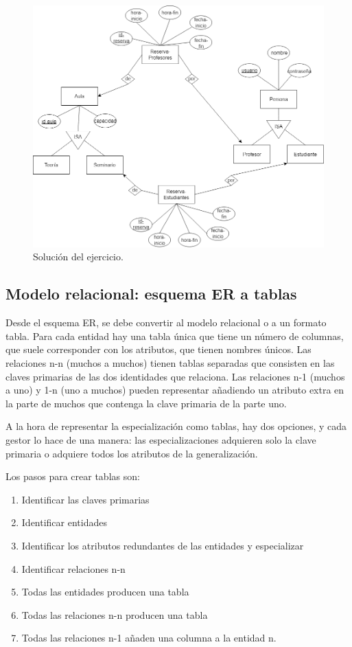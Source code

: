 \begin{figure}[htbp]
\centering
\includegraphics[width=0.7\linewidth]{figs/ejercicio-er-1.drawio.png}
\caption{Solución del ejercicio.}
\end{figure}

\subsection{Modelo relacional: esquema ER a tablas}
Desde el esquema ER, se debe convertir al modelo relacional o a un formato tabla. Para cada entidad hay una tabla única que tiene un número de columnas, que suele corresponder con los atributos, que tienen nombres únicos. Las relaciones n-n (muchos a muchos) tienen tablas separadas que consisten en las claves primarias de las dos identidades que relaciona. Las relaciones n-1 (muchos a uno) y 1-n (uno a muchos) pueden representar añadiendo un atributo extra en la parte de muchos que contenga la clave primaria de la parte uno.

A la hora de representar la especialización como tablas, hay dos opciones, y cada gestor lo hace de una manera: las especializaciones adquieren solo la clave primaria o adquiere todos los atributos de la generalización.

Los pasos para crear tablas son:
\begin{enumerate}
\item Identificar las claves primarias
\item Identificar entidades
\item Identificar los atributos redundantes de las entidades y especializar
\item Identificar relaciones n-n
\item Todas las entidades producen una tabla
\item Todas las relaciones n-n producen una tabla
\item Todas las relaciones n-1 añaden una columna a la entidad n.
\end{enumerate}

